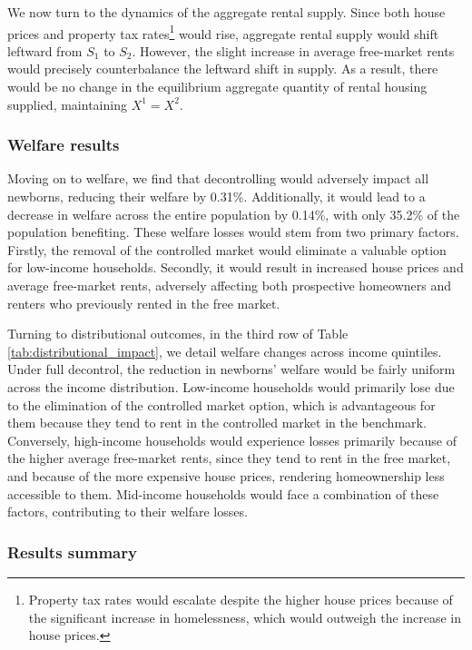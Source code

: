 \documentclass[parskip=full]{article}
\begin{document}
We now turn to the dynamics of the aggregate rental supply. Since both house prices and property tax rates\footnote{Property tax rates would escalate despite the higher house prices because of the significant increase in homelessness, which would outweigh the increase in house prices.} would rise, aggregate rental supply would shift leftward from $S_{1}$ to $S_{2}$. However, the slight increase in average free-market rents would precisely counterbalance the leftward shift in supply. As a result, there would be no change in the equilibrium aggregate quantity of rental housing supplied, maintaining $X^{1}=X^{2}$.

\subsubsection{Welfare results}

Moving on to welfare, we find that decontrolling would adversely impact all newborns, reducing their welfare by 0.31\%. Additionally, it would lead to a decrease in welfare across the entire population by 0.14\%, with only 35.2\% of the population benefiting. These welfare losses would stem from two primary factors. Firstly, the removal of the controlled market would eliminate a valuable option for low-income households. Secondly, it would result in increased house prices and average free-market rents, adversely affecting both prospective homeowners and renters who previously rented in the free market.

Turning to distributional outcomes, in the third row of Table \ref{tab:distributional_impact}, we detail welfare changes across income quintiles. Under full decontrol, the reduction in newborns' welfare would be fairly uniform across the income distribution. Low-income households would primarily lose due to the elimination of the controlled market option, which is advantageous for them because they tend to rent in the controlled market in the benchmark. Conversely, high-income households would experience losses primarily because of the higher average free-market rents, since they tend to rent in the free market, and because of the more expensive house prices, rendering homeownership less accessible to them. Mid-income households would face a combination of these factors, contributing to their welfare losses.

\subsubsection{Results summary}
\end{document}
